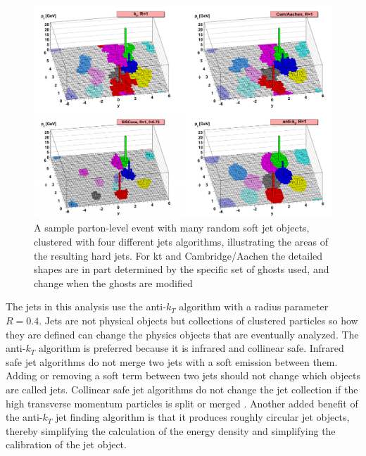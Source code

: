 \begin{figure}[h!]
	\centering
	\includegraphics[width=\columnwidth]{../ThesisImages/Simulation/VarJetAlgs.png}
	\caption[A sample parton-level event with many random soft jet objects, clustered with four different jets algorithms, illustrating the areas of the resulting hard jets. For kt and Cambridge/Aachen the detailed shapes are in part determined by the specific set of ghosts used, and change when the ghosts are modified]{A sample parton-level event with many random soft jet objects, clustered with four different jets algorithms, illustrating the areas of the resulting hard jets. For kt and Cambridge/Aachen the detailed shapes are in part determined by the specific set of ghosts used, and change when the ghosts are modified \cite{antikt} 
	}
	\label{fig:VarJetAlgs}
\end{figure}

The jets in this analysis use the anti-$k_T$ algorithm \cite{antikt} with a radius parameter $R=0.4$.  Jets are not physical objects but collections of clustered particles so how they are defined can change the physics objects that are eventually analyzed.  The anti-$k_T$ algorithm is preferred because it is infrared and collinear safe.  Infrared safe jet algorithms do not merge two jets with a soft emission between them.  Adding or removing a soft term between two jets should not change which objects are called jets.  Collinear safe jet algorithms do not change the jet collection if the high transverse momentum particles is split or merged .  Another added benefit of the anti-$k_T$ jet finding algorithm is that it produces roughly circular jet objects, thereby simplifying the calculation of the energy density and simplifying the calibration of the jet object.

